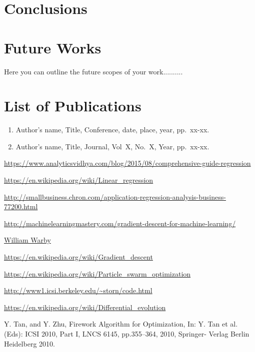\documentclass[11pt, a4paper]{report}
\begin{document}
\newpage

\chapter{Conclusions}

\newpage

\chapter{Future Works}
Here you can outline the future scopes of your work..........
\newpage

\chapter*{List of Publications}
\begin{enumerate}
\item Author's name, Title, Conference, date, place, year, pp.~xx-xx.
\item Author's name, Title, Journal, Vol~X, No.~X, Year, pp.~xx-xx.
\end{enumerate}
\newpage
\begin{thebibliography}{50}
	
\url{https://www.analyticsvidhya.com/blog/2015/08/comprehensive-guide-regression}

\url{https://en.wikipedia.org/wiki/Linear_regression}

\url{http://smallbusiness.chron.com/application-regression-analysis-business-77200.html}

\url{http://machinelearningmastery.com/gradient-descent-for-machine-learning/}

\href{https://www.flickr.com/photos/wwarby/4046737583/}{William Warby}

\url{https://en.wikipedia.org/wiki/Gradient_descent}

\url{https://en.wikipedia.org/wiki/Particle_swarm_optimization}

\url{http://www1.icsi.berkeley.edu/~storn/code.html}

\url{https://en.wikipedia.org/wiki/Differential_evolution}

Y. Tan, and Y. Zhu, Firework Algorithm for Optimization, In: Y. Tan et
al.(Eds): ICSI 2010, Part I, LNCS 6145, pp.355–364, 2010, Springer-
Verlag Berlin Heidelberg 2010.

\end{thebibliography}
\end{document}
